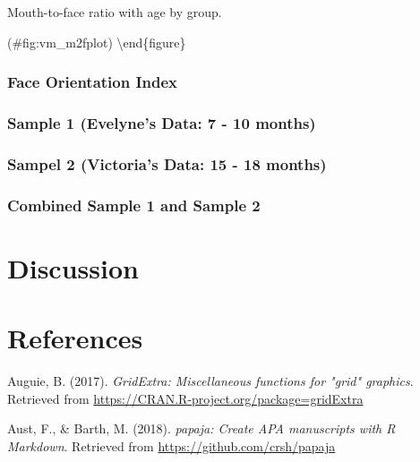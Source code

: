 \documentclass[english,man,floatsintext]{apa6}
\begin{document}
\caption{Mouth-to-face ratio with age by group.}

(\#fig:vm\_m2fplot)
\textbackslash{}end\{figure\}

\hypertarget{face-orientation-index-1}{%
\subsubsection{Face Orientation Index}\label{face-orientation-index-1}}

\hypertarget{sample-1-evelynes-data-7---10-months-5}{%
\subsubsection{Sample 1 (Evelyne's Data: 7 - 10 months)}\label{sample-1-evelynes-data-7---10-months-5}}

\hypertarget{sampel-2-victorias-data-15---18-months}{%
\subsubsection{Sampel 2 (Victoria's Data: 15 - 18 months)}\label{sampel-2-victorias-data-15---18-months}}

\hypertarget{combined-sample-1-and-sample-2}{%
\subsubsection{Combined Sample 1 and Sample 2}\label{combined-sample-1-and-sample-2}}

\hypertarget{discussion}{%
\section{Discussion}\label{discussion}}

\newpage

\hypertarget{references}{%
\section{References}\label{references}}

\begingroup
\setlength{\parindent}{-0.5in}
\setlength{\leftskip}{0.5in}

\hypertarget{refs}{}
\leavevmode\hypertarget{ref-R-gridExtra}{}%
Auguie, B. (2017). \emph{GridExtra: Miscellaneous functions for "grid" graphics}. Retrieved from \url{https://CRAN.R-project.org/package=gridExtra}

\leavevmode\hypertarget{ref-R-papaja}{}%
Aust, F., \& Barth, M. (2018). \emph{papaja: Create APA manuscripts with R Markdown}. Retrieved from \url{https://github.com/crsh/papaja}
\end{document}
